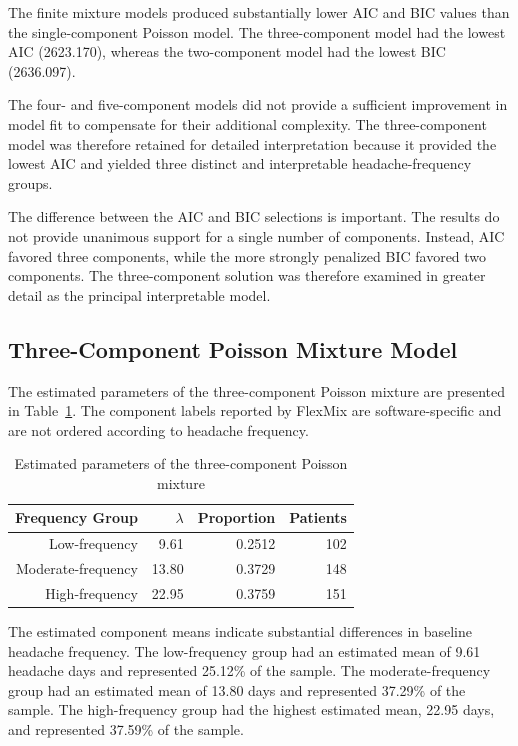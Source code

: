 The finite mixture models produced substantially lower AIC and BIC
values than the single-component Poisson model. The three-component
model had the lowest AIC (2623.170), whereas the two-component model
had the lowest BIC (2636.097).

The four- and five-component models did not provide a sufficient
improvement in model fit to compensate for their additional
complexity. The three-component model was therefore retained for
detailed interpretation because it provided the lowest AIC and
yielded three distinct and interpretable headache-frequency groups.

The difference between the AIC and BIC selections is important. The
results do not provide unanimous support for a single number of
components. Instead, AIC favored three components, while the more
strongly penalized BIC favored two components. The three-component
solution was therefore examined in greater detail as the principal
interpretable model.

\subsection{Three-Component Poisson Mixture Model}

The estimated parameters of the three-component Poisson mixture are
presented in Table~\ref{tab:threecomponent}. The component labels
reported by FlexMix are software-specific and are not ordered
according to headache frequency.

\begin{table}[H]
\centering
\caption{Estimated parameters of the three-component Poisson mixture}
\label{tab:threecomponent}
\begin{tabular}{rrrr}
\toprule
Frequency Group & $\lambda$ & Proportion & Patients \\
\midrule
Low-frequency & 9.61 & 0.2512 & 102 \\
Moderate-frequency & 13.80 & 0.3729 & 148 \\
High-frequency & 22.95 & 0.3759 & 151 \\
\bottomrule
\end{tabular}
\end{table}

The estimated component means indicate substantial differences in
baseline headache frequency. The low-frequency group had an
estimated mean of 9.61 headache days and represented 25.12\% of the
sample. The moderate-frequency group had an estimated mean of
13.80 days and represented 37.29\% of the sample. The high-frequency
group had the highest estimated mean, 22.95 days, and represented
37.59\% of the sample.

